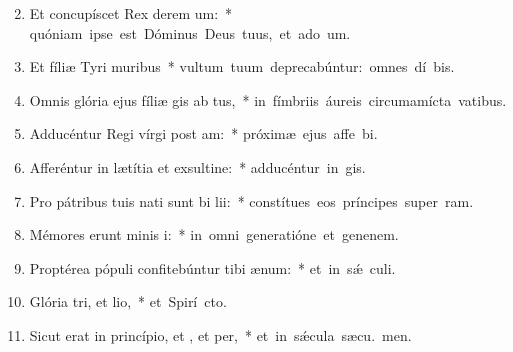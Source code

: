 \begin{flushleft}
\begin{enumerate}[leftmargin=*]
\setcounter{enumi}{1}

\item Et concupíscet Rex derem um:~* \mbox{quóniam ipse est Dóminus Deus tuus, et ado um.}
\item Et fíliæ Tyri  muribus~* \mbox{vultum tuum deprecabúntur: omnes dí bis.}
\item Omnis glória ejus fíliæ gis ab tus,~* \mbox{in fímbriis áureis circumamícta vatibus.}
\item Adducéntur Regi vírgi post am:~* \mbox{próximæ ejus affe bi.}
\item Afferéntur in lætítia et exsultine:~* \mbox{adducéntur in  gis.}
\item Pro pátribus tuis nati sunt bi lii:~* \mbox{constítues eos príncipes super  ram.}
\item Mémores erunt minis i:~* \mbox{in omni generatióne et genenem.}
\item Proptérea pópuli confitebúntur tibi  ænum:~* \mbox{et in s\'{\ae} culi.}
\item Glória tri, et lio,~* \mbox{et Spirí cto.}
\item Sicut erat in princípio, et , et per,~* \mbox{et in s\'{\ae}cula sæcu. men.}


\end{enumerate}
\end{flushleft}

